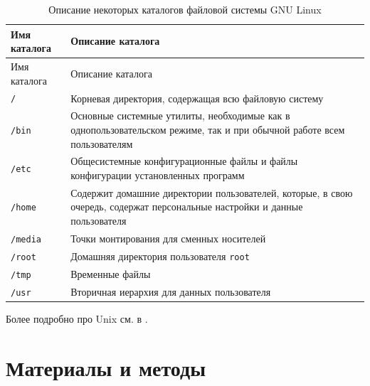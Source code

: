 \documentclass[
  english,
  russian,
  12pt,
  a4paper,
  DIV=11,
  numbers=noendperiod]{scrreprt}
\begin{document}
\begin{longtable}[]{@{}
  >{\raggedright\arraybackslash}p{}
  >{\raggedright\arraybackslash}p{}@{}}
\caption{Описание некоторых каталогов файловой системы GNU
Linux}\label{tbl-std-dir}\tabularnewline
\toprule\noalign{}
\begin{minipage}[b]{\linewidth}\raggedright
Имя каталога
\end{minipage} & \begin{minipage}[b]{\linewidth}\raggedright
Описание каталога
\end{minipage} \\
\midrule\noalign{}
\endfirsthead
\toprule\noalign{}
\begin{minipage}[b]{\linewidth}\raggedright
Имя каталога
\end{minipage} & \begin{minipage}[b]{\linewidth}\raggedright
Описание каталога
\end{minipage} \\
\midrule\noalign{}
\endhead
\bottomrule\noalign{}
\endlastfoot
\texttt{/} & Корневая директория, содержащая всю файловую систему \\
\texttt{/bin} & Основные системные утилиты, необходимые как в
однопользовательском режиме, так и при обычной работе всем
пользователям \\
\texttt{/etc} & Общесистемные конфигурационные файлы и файлы
конфигурации установленных программ \\
\texttt{/home} & Содержит домашние директории пользователей, которые, в
свою очередь, содержат персональные настройки и данные пользователя \\
\texttt{/media} & Точки монтирования для сменных носителей \\
\texttt{/root} & Домашняя директория пользователя \texttt{root} \\
\texttt{/tmp} & Временные файлы \\
\texttt{/usr} & Вторичная иерархия для данных пользователя \\
\end{longtable}

Более подробно про Unix см. в
\autocite{tanenbaum_book_modern-os_ru,robbins_book_bash_en,zarrelli_book_mastering-bash_en,newham_book_learning-bash_en}.

\chapter{Материалы и
методы}\label{ux43cux430ux442ux435ux440ux438ux430ux43bux44b-ux438-ux43cux435ux442ux43eux434ux44b}
\end{document}
